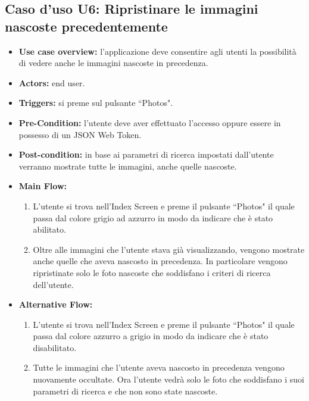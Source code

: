 \subsection*{Caso d'uso U6: Ripristinare le immagini nascoste precedentemente}
\begin{itemize}
    \item  \textbf{Use case overview:} l'applicazione deve consentire agli utenti la possibilit\`a di vedere anche le immagini nascoste in precedenza.
    \item \textbf{Actors:} end user.
    \item \textbf{Triggers:} si preme sul pulsante ``Photos".
    \item \textbf{Pre-Condition:} l'utente deve aver effettuato l'accesso oppure essere in possesso di un JSON Web Token.
    \item \textbf{Post-condition:} in base ai parametri di ricerca impostati dall'utente verranno mostrate tutte le immagini, anche quelle nascoste.
    \item \textbf{Main Flow:} \begin{enumerate}
              \item L'utente si trova nell'Index Screen e preme il pulsante ``Photos" il quale passa dal colore grigio ad azzurro in modo da indicare che \`e stato abilitato.
              \item Oltre alle immagini che l'utente stava gi\`a visualizzando, vengono mostrate anche quelle che aveva nascosto in precedenza. In particolare vengono ripristinate solo le foto nascoste che soddisfano i criteri di ricerca dell'utente.
          \end{enumerate}
    \item \textbf{Alternative Flow:}\begin{enumerate}
              \item L'utente si trova nell'Index Screen e preme il pulsante ``Photos" il quale passa dal colore azzurro a grigio in modo da indicare che \`e stato disabilitato.
              \item Tutte le immagini che l'utente aveva nascosto in precedenza vengono nuovamente occultate. Ora l'utente vedr\`a solo le foto che soddisfano i suoi parametri di ricerca e che non sono state nascoste.

          \end{enumerate}
\end{itemize}